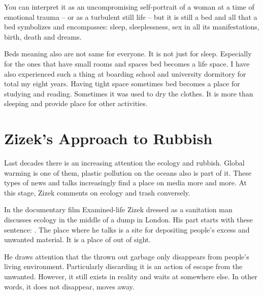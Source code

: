 You can interpret it as an uncompromising self-portrait of a woman at a time of emotional trauma – or as a turbulent still life – but it is still a bed and all that a bed symbolizes and encompasses: sleep, sleeplessness, sex in all its manifestations, birth, death and dreams.

Beds meaning also are not same for everyone. It is not just for sleep. Especially for the ones that have small rooms and spaces bed becomes a life space. I have also experienced such a thing at boarding school and university dormitory for total my eight years. Having tight space sometimes bed becomes a place for studying and reading. Sometimes it was used to dry the clothes. It is more than sleeping and provide place for other activities.






%
%
\section{Zizek's Approach to Rubbish}
Last decades there is an increasing attention the ecology and rubbish. Global warming is one of them, plastic pollution on the oceans also is part of it. These types of news and talks increasingly find a place on media more and more. At this stage, Zizek comments on ecology and trash conversely.


In the documentary film Examined-life Zizek dressed as a sanitation man discusses ecology in the middle of a dump in London. His part starts with these sentence: . The place where he talks is a site for depositing people's excess and unwanted material. It is a place of out of sight.

He draws attention that the thrown out garbage only disappears from people's living environment. Particularly discarding it is an action of escape from the unwanted. However, it still exists in reality and waits at somewhere else. In other words, it does not disappear, moves away.

